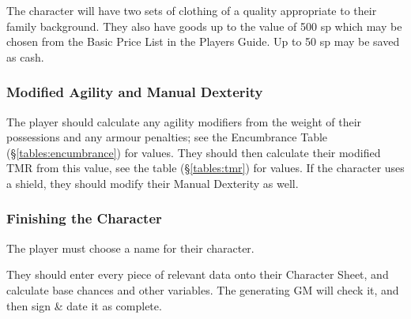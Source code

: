 \begin{multicols*}{3}
The character will have two sets of clothing of a quality appropriate
to their family background. They also have goods up to the value of
500 sp which may be chosen from the Basic Price List in the Players
Guide. Up to 50 sp may be saved as cash.

\subsubsection{Modified Agility and Manual Dexterity}

The player should calculate any agility modifiers from the weight of
their possessions and any armour penalties; see the Encumbrance Table
(\S\ref{tables:encumbrance}) for values. They should then calculate
their modified TMR from this value, see the table (\S\ref{tables:tmr})
for values. If the character uses a shield, they should modify their
Manual Dexterity as well.

\subsubsection{Finishing the Character}

The player must choose a name for their character.

They should enter every piece of relevant data onto their Character
Sheet, and calculate base chances and other variables. The generating
GM will check it, and then sign \& date it as complete.


\end{multicols*}
